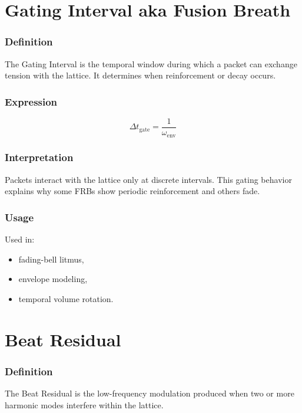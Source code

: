\documentclass[12pt,oneside]{book}
\begin{document}

\section{Gating Interval aka Fusion Breath}

\subsubsection{Definition}
The Gating Interval is the temporal window during which a packet can exchange tension with the
lattice. It determines when reinforcement or decay occurs.

\subsubsection{Expression}


\[
\Delta t_{\mathrm{gate}} = \frac{1}{\omega_{\mathrm{env}}}
\]



\subsubsection{Interpretation}
Packets interact with the lattice only at discrete intervals.  
This gating behavior explains why some FRBs show periodic reinforcement and others fade.

\subsubsection{Usage}
Used in:
\begin{itemize}
    \item fading-bell litmus,
    \item envelope modeling,
    \item temporal volume rotation.
\end{itemize}


\section{Beat Residual}

\subsubsection{Definition}
The Beat Residual is the low-frequency modulation produced when two or more harmonic modes
interfere within the lattice.
\end{document}
